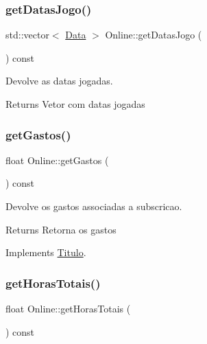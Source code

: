 \subsubsection{\texorpdfstring{get\+Datas\+Jogo()}{getDatasJogo()}}
{\footnotesize\ttfamily std\+::vector$<$ \mbox{\hyperlink{class_data}{Data}} $>$ Online\+::get\+Datas\+Jogo (\begin{DoxyParamCaption}{ }\end{DoxyParamCaption}) const}



Devolve as datas jogadas. 

\begin{DoxyReturn}{Returns}
Vetor com datas jogadas 
\end{DoxyReturn}
\mbox{\label{class_online_ac3a2197523ee26effcacd9a2a9fe968e}} 
\subsubsection{\texorpdfstring{get\+Gastos()}{getGastos()}}
{\footnotesize\ttfamily float Online\+::get\+Gastos (\begin{DoxyParamCaption}{ }\end{DoxyParamCaption}) const\hspace{0.3cm}{\ttfamily [virtual]}}



Devolve os gastos associadas a subscricao. 

\begin{DoxyReturn}{Returns}
Retorna os gastos 
\end{DoxyReturn}


Implements \mbox{\hyperlink{class_titulo_a9272448eec05cd9c026c54824bf2e727}{Titulo}}.

\mbox{\label{class_online_ad0a23d2f1a2f804479ff346be0fdc686}} 
\subsubsection{\texorpdfstring{get\+Horas\+Totais()}{getHorasTotais()}}
{\footnotesize\ttfamily float Online\+::get\+Horas\+Totais (\begin{DoxyParamCaption}{ }\end{DoxyParamCaption}) const}



